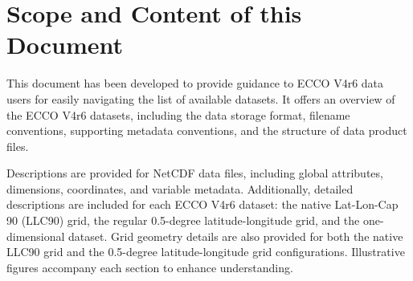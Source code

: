 \pagebreak
\section{Scope and Content of this Document}

\par This document has been developed to provide guidance to ECCO V4r6 data users for easily navigating the list of available datasets. It offers an overview of the ECCO V4r6 datasets, including the data storage format, filename conventions, supporting metadata conventions, and the structure of data product files.

\par Descriptions are provided for NetCDF data files, including global attributes, dimensions, coordinates, and variable metadata. Additionally, detailed descriptions are included for each ECCO V4r6 dataset: the native Lat-Lon-Cap 90 (LLC90) grid, the regular 0.5-degree latitude-longitude grid, and the one-dimensional dataset. Grid geometry details are also provided for both the native LLC90 grid and the 0.5-degree latitude-longitude grid configurations. Illustrative figures accompany each section to enhance understanding.
